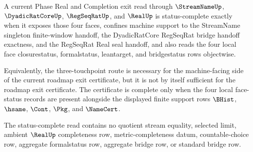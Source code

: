 \begin{theorem}
\label{thm:streamname-real-completion-objectwise-status-completeness}
A current Phase Real and Completion exit read through $\StreamNameUp$, $\DyadicRatCoreUp$, $\RegSeqRatUp$, and $\RealUp$ is status-complete exactly when it exposes those four faces, confines machine support to the StreamName singleton finite-window handoff, the DyadicRatCore RegSeqRat bridge handoff exactness, and the RegSeqRat Real seal handoff, and also reads the four local face closurestatus, formalstatus, leantarget, and bridgestatus rows objectwise.

Equivalently, the three-touchpoint route is necessary for the machine-facing side of the current roadmap exit certificate, but it is not by itself sufficient for the roadmap exit certificate. The certificate is complete only when the four local face-status records are present alongside the displayed finite support rows $\BHist$, $\hsame$, $\Cont$, $\Pkg$, and $\NameCert$.

The status-complete read contains no quotient stream equality, selected limit, ambient $\RealUp$ completeness row, metric-completeness datum, countable-choice row, aggregate formalstatus row, aggregate bridge row, or standard bridge row.
\end{theorem}
